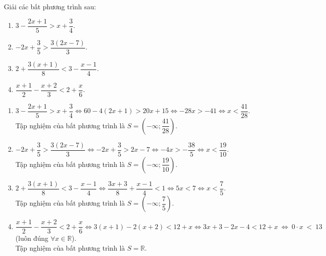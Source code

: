 \begin{bt}%
	Giải các bất phương trình sau:
	\begin{multicols}{2}
		\begin{enumerate}
			\item $3-\dfrac{2x+1}{5} > x + \dfrac{3}{4}$.
			\item $-2x+\dfrac{3}{5} > \dfrac{3(2x-7)}{3}$.
			\item $2+\dfrac{3(x+1)}{8} < 3 - \dfrac{x-1}{4}$.
			\item $\dfrac{x+1}{2}-\dfrac{x+2}{3}<2+\dfrac{x}{6}$.
		\end{enumerate}
	\end{multicols}
	\loigiai
	{
		\begin{enumerate}
			\item $3-\dfrac{2x+1}{5} > x + \dfrac{3}{4} \Leftrightarrow 60-4(2x+1)>20x+15 \Leftrightarrow -28x > -41 \Leftrightarrow x < \dfrac{41}{28}$.\\
			Tập nghiệm của bất phương trình là $S=\left(-\infty; \dfrac{41}{28}\right)$.
			\item $-2x+\dfrac{3}{5} > \dfrac{3(2x-7)}{3} \Leftrightarrow -2x + \dfrac{3}{5} > 2x-7 \Leftrightarrow -4x > -\dfrac{38}{5} \Leftrightarrow x < \dfrac{19}{10}$.\\
			Tập nghiệm của bất phương trình là $S=\left(-\infty; \dfrac{19}{10}\right)$.
			\item $2+\dfrac{3(x+1)}{8} < 3 - \dfrac{x-1}{4} \Leftrightarrow \dfrac{3x+3}{8} + \dfrac{x-1}{4} < 1 \Leftrightarrow 5x < 7 \Leftrightarrow x < \dfrac{7}{5}$.\\
			Tập nghiệm của bất phương trình là $S=\left(-\infty; \dfrac{7}{5}\right)$.
			\item $\dfrac{x+1}{2}-\dfrac{x+2}{3}<2+\dfrac{x}{6} \Leftrightarrow 3(x+1) - 2(x+2) < 12 +x \Leftrightarrow 3x+3 -2x-4 < 12+x ~\Leftrightarrow~ 0\cdot x ~<~ 13$ (luôn đúng $ \forall x \in \mathbb{R}$).\\
			Tập nghiệm của bất phương trình là $S=\mathbb{R}$.
		\end{enumerate}
	}
\end{bt}



